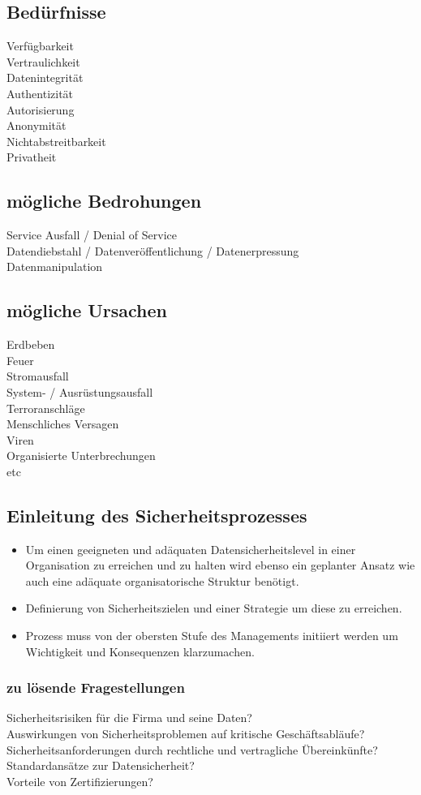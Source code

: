 \documentclass{article} %
\begin{document}
\subsection{Bedürfnisse}
Verfügbarkeit\\
Vertraulichkeit\\
Datenintegrität\\
Authentizität\\
Autorisierung\\
Anonymität\\
Nichtabstreitbarkeit\\
Privatheit\\
\subsection{mögliche Bedrohungen}
Service Ausfall / Denial of Service\\
Datendiebstahl / Datenveröffentlichung / Datenerpressung\\
Datenmanipulation\\
\subsection{mögliche Ursachen}
Erdbeben\\
Feuer\\
Stromausfall\\
System- / Ausrüstungsausfall\\
Terroranschläge\\
Menschliches Versagen\\
Viren\\
Organisierte Unterbrechungen\\
etc
\subsection{Einleitung des Sicherheitsprozesses}
\begin{itemize}
	\item Um einen geeigneten und adäquaten Datensicherheitslevel in einer Organisation zu erreichen und zu halten wird ebenso ein geplanter Ansatz wie auch eine adäquate organisatorische Struktur benötigt.
    \item Definierung von Sicherheitszielen und einer Strategie um diese zu erreichen.
    \item Prozess muss von der obersten Stufe des Managements initiiert werden um Wichtigkeit und Konsequenzen klarzumachen.
\end{itemize}
\subsubsection{zu lösende Fragestellungen}
Sicherheitsrisiken für die Firma und seine Daten?\\
Auswirkungen von Sicherheitsproblemen auf kritische Geschäftsabläufe?\\
Sicherheitsanforderungen durch rechtliche und vertragliche Übereinkünfte?\\
Standardansätze zur Datensicherheit?\\
Vorteile von Zertifizierungen?\\
\end{document}
